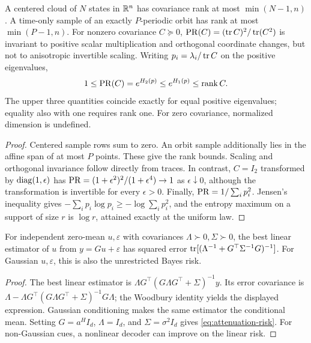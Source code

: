 \begin{proposition}
\label{prop:ceilings}\label{prop:pr}
A centered cloud of $N$ states in $\mathbb{R}^n$ has covariance rank at most
$\min(N-1,n)$. A time-only sample of an exactly $P$-periodic orbit has rank at
most $\min(P-1,n)$. For nonzero covariance $C\succeq0$,
$\operatorname{PR}(C)=(\operatorname{tr} C)^2/\operatorname{tr}(C^2)$ is invariant to positive scalar multiplication
and orthogonal coordinate changes, but not to anisotropic invertible scaling.
Writing $p_i=\lambda_i/\operatorname{tr} C$ on the positive eigenvalues,
\[
 1\le\operatorname{PR}(C)=e^{H_2(p)}\le e^{H_1(p)}\le\operatorname{rank} C.
\]
The upper three quantities coincide exactly for equal positive eigenvalues;
equality also with one requires rank one. For zero covariance, normalized
dimension is undefined.
\end{proposition}
\begin{proof}
Centered sample rows sum to zero. An orbit sample additionally lies in the
affine span of at most $P$ points. These give the rank bounds. Scaling and
orthogonal invariance follow directly from traces. In contrast,
$C=I_2$ transformed by $\operatorname{diag}(1,\epsilon)$ has
$\operatorname{PR}=(1+\epsilon^2)^2/(1+\epsilon^4)\to1$ as $\epsilon\downarrow0$,
although the transformation is invertible for every $\epsilon>0$.
Finally, $\operatorname{PR}=1/\sum_i p_i^2$. Jensen's inequality gives
$-\sum_i p_i\log p_i\ge-\log\sum_i p_i^2$, and the entropy maximum on a
support of size $r$ is $\log r$, attained exactly at the uniform law.
\end{proof}

\begin{lemma}
\label{prop:channel}
For independent zero-mean $u,\varepsilon$ with covariances
$\Lambda\succ0,\Sigma\succ0$, the best linear estimator of $u$ from
$y=Gu+\varepsilon$ has squared error
$\operatorname{tr}[(\Lambda^{-1}+G^\top\Sigma^{-1}G)^{-1}]$.
For Gaussian $u,\varepsilon$, this is also the unrestricted Bayes risk.
\end{lemma}
\begin{proof}
The best linear estimator is
$\Lambda G^\top(G\Lambda G^\top+\Sigma)^{-1}y$.
Its error covariance is
$\Lambda-\Lambda G^\top(G\Lambda G^\top+\Sigma)^{-1}G\Lambda$;
the Woodbury identity yields the displayed expression. Gaussian conditioning
makes the same estimator the conditional mean. Setting
$G=a^HI_d$, $\Lambda=I_d$, and $\Sigma=\sigma^2I_d$ gives
\cref{eq:attenuation-risk}. For non-Gaussian cues, a nonlinear decoder can
improve on the linear risk.
\end{proof}

